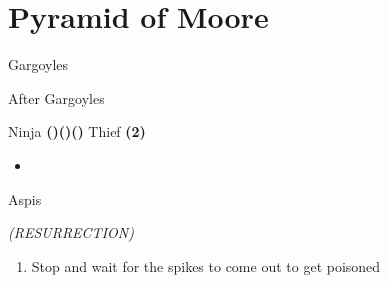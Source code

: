 \chapter{Pyramid of Moore}

\vspace{\baselineskip}

\begin{paracol}{2}

\begin{boss}{Gargoyles}
    \varwb
    \begin{round}{1}
        \faris \rightCommand{\gilToss}
        \cara \leftCommand{\gilToss}
        \bartz \rightCommand{\gilToss}
        \faris \rightCommand{\gilToss}
    \end{round}
    \varwe
\end{boss}

\begin{menu}{After Gargoyles}
    \varwb
    \begin{itemMenu}
        \hiPotionMenu {}
    \end{itemMenu}
    \begin{abilityMenu}
        \faris \ability{!\black}
    \end{abilityMenu}
    \begin{jobMenu}
        \cara Ninja \textbf{(\pointLeft)(\pointDown)(\pointLeft) \ability{!\white}}
        \bartz Thief \textbf{(2\pointRight)} \ability{!\combine} \optimize
        \begin{itemize}
            \item[] \equip{\stealthRobe, \greenBeret}
        \end{itemize}
    \end{jobMenu}
    \varwe
\end{menu}

\switchcolumnTwice[*]
\begin{encounter}{Aspis}
    \varwb
    \begin{round}{1}
        \bartz \rightCommand{\combine} \then \battleGroup{\hiPotion \space + \phoenixDown} \textit{(RESURRECTION)} \then {} 
    \end{round}
    \varwe
\end{encounter}

\begin{enumerate}[resume]
    \item Stop and wait for the spikes to come out to get poisoned
\end{enumerate}


\end{paracol}
